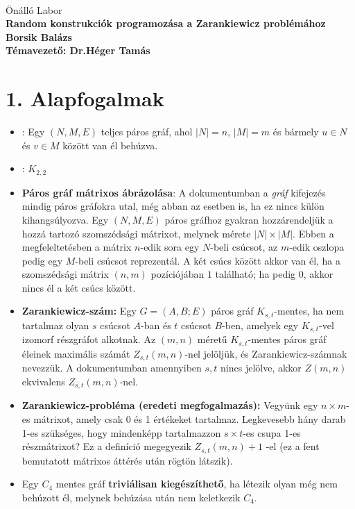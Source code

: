 \documentclass[12pt,a4paper]{article}
\begin{document}
 \ \
\vspace{2mm}
\begin{center}
{\Large\sc
Önálló Labor\\[5mm]
\bf 
Random konstrukciók programozása a Zarankiewicz problémához
\\[10mm]
{\Large
Borsik Balázs
}\\[10mm]
Témavezető: Dr.Héger Tamás
}
\end{center}
\vspace{1cm}

\section*{1. Alapfogalmak}
\begin{itemize}
    \item {}: Egy $(N,M,E)$ teljes páros gráf, ahol $|N|=n$, $|M|=m$ és bármely $u \in N$ és $v \in M$ között van él behúzva.
    \item \bm{$C_4$}: $K_{2,2}$
    \item \textbf{Páros gráf mátrixos ábrázolása}: A dokumentumban a \emph{gráf} kifejezés mindig páros gráfokra utal, még abban az esetben is, ha ez nincs külön kihangsúlyozva. Egy $(N, M, E)$ páros gráfhoz gyakran hozzárendeljük a hozzá tartozó szomszédsági mátrixot, melynek mérete $|N| \times |M|$. Ebben a megfeleltetésben a mátrix $n$-edik sora egy $N$-beli csúcsot, az $m$-edik oszlopa pedig egy $M$-beli csúcsot reprezentál. A két csúcs között akkor van él, ha a szomszédsági mátrix $(n,m)$ pozíciójában $1$ található; ha pedig $0$, akkor nincs él a két csúcs között.
    \item \textbf{Zarankiewicz-szám:} Egy $G = (A,B;E)$ páros gráf $K_{s,t}$-mentes, ha nem tartalmaz olyan $s$ csúcsot $A$-ban és $t$ csúcsot $B$-ben, amelyek egy $K_{s,t}$-vel izomorf részgráfot alkotnak. Az $(m,n)$ méretű $K_{s,t}$-mentes páros gráf éleinek maximális számát $Z_{s,t}(m,n)$-nel jelöljük, és Zarankiewicz-számnak nevezzük. A dokumentumban amennyiben $s,t$ nincs jelölve, akkor $Z(m,n)$ ekvivalens $Z_{s,t}(m,n)$-nel.
    \item \textbf{Zarankiewicz-probléma (eredeti megfogalmazás):} Vegyünk egy $n \times m$-es mátrixot, amely csak 0 és 1 értékeket tartalmaz. Legkevesebb hány darab 1-es szükséges, hogy mindenképp tartalmazzon $s \times t$-es csupa 1-es részmátrixot? Ez a definíció megegyezik $Z_{s,t}(m,n) + 1$ -el (ez a fent bemutatott mátrixos áttérés után rögtön látszik).
    \item Egy $C_4$ mentes gráf \textbf{triviálisan kiegészíthető}, ha létezik olyan még nem behúzott él, melynek behúzása után nem keletkezik $C_4$.
\end{itemize}
\end{document}
